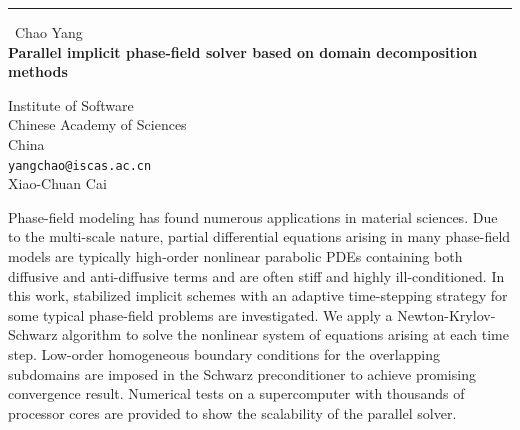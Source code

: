 \documentclass{report}
\begin{document}
\begin{center}
\rule{6in}{1pt} \
{\large Chao Yang \\
{\bf Parallel implicit phase-field solver based on domain decomposition methods}}

Institute of Software \\ Chinese Academy of Sciences \\ China
\\
{\tt yangchao@iscas.ac.cn}\\
Xiao-Chuan Cai\end{center}

Phase-field modeling has found numerous applications in material
sciences. Due to the multi-scale nature, partial differential equations
arising in many phase-field models are typically high-order nonlinear
parabolic PDEs containing both diffusive and anti-diffusive terms and are
often stiff and highly ill-conditioned. In this work, stabilized implicit
schemes with an adaptive time-stepping strategy for some typical
phase-field problems are investigated. We apply a Newton-Krylov-Schwarz
algorithm to solve the nonlinear system of equations arising at each time
step. Low-order homogeneous boundary conditions for the overlapping
subdomains are imposed in the Schwarz preconditioner to achieve promising
convergence result. Numerical tests on a supercomputer with thousands of
processor cores are provided to show the scalability of the parallel
solver.
\end{document}
